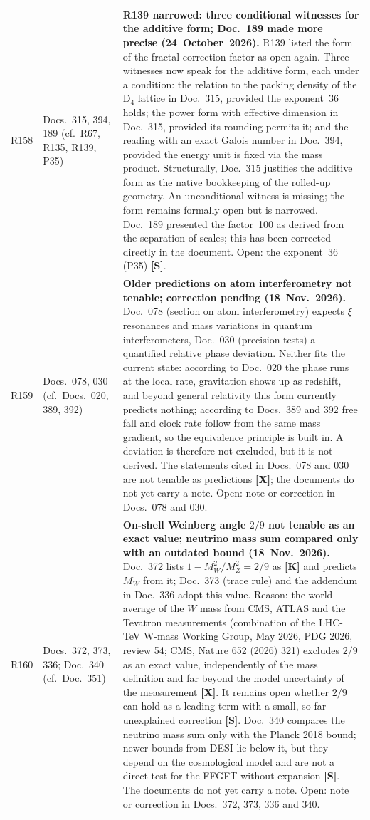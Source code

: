\begin{longtable}{@{}p{0.9cm}p{3.1cm}p{10.2cm}@{}}
R158 & Docs.~315, 394, 189 (cf.\ R67, R135, R139, P35) & \textbf{R139 narrowed: three conditional witnesses for the additive form; Doc.~189 made more precise (24~October~2026).} R139 listed the form of the fractal correction factor as open again. Three witnesses now speak for the additive form, each under a condition: the relation to the packing density of the $\mathrm{D}_4$ lattice in Doc.~315, provided the exponent~36 holds; the power form with effective dimension in Doc.~315, provided its rounding permits it; and the reading with an exact Galois number in Doc.~394, provided the energy unit is fixed via the mass product. Structurally, Doc.~315 justifies the additive form as the native bookkeeping of the rolled-up geometry. An unconditional witness is missing; the form remains formally open but is narrowed. Doc.~189 presented the factor~100 as derived from the separation of scales; this has been corrected directly in the document. Open: the exponent~36 (P35) \textbf{[S]}. \\
R159 & Docs.~078, 030 (cf.\ Docs.~020, 389, 392) & \textbf{Older predictions on atom interferometry not tenable; correction pending (18~Nov.~2026).} Doc.~078 (section on atom interferometry) expects $\xi$ resonances and mass variations in quantum interferometers, Doc.~030 (precision tests) a quantified relative phase deviation. Neither fits the current state: according to Doc.~020 the phase runs at the local rate, gravitation shows up as redshift, and beyond general relativity this form currently predicts nothing; according to Docs.~389 and 392 free fall and clock rate follow from the same mass gradient, so the equivalence principle is built in. A deviation is therefore not excluded, but it is not derived. The statements cited in Docs.~078 and 030 are not tenable as predictions \textbf{[X]}; the documents do not yet carry a note. Open: note or correction in Docs.~078 and 030. \\
R160 & Docs.~372, 373, 336; Doc.~340 (cf.\ Doc.~351) & \textbf{On-shell Weinberg angle $2/9$ not tenable as an exact value; neutrino mass sum compared only with an outdated bound (18~Nov.~2026).} Doc.~372 lists $1-M_W^2/M_Z^2=2/9$ as \textbf{[K]} and predicts $M_W$ from it; Doc.~373 (trace rule) and the addendum in Doc.~336 adopt this value. Reason: the world average of the $W$ mass from CMS, ATLAS and the Tevatron measurements (combination of the LHC-TeV W-mass Working Group, May 2026, PDG 2026, review 54; CMS, Nature 652 (2026) 321) excludes $2/9$ as an exact value, independently of the mass definition and far beyond the model uncertainty of the measurement \textbf{[X]}. It remains open whether $2/9$ can hold as a leading term with a small, so far unexplained correction \textbf{[S]}. Doc.~340 compares the neutrino mass sum only with the Planck 2018 bound; newer bounds from DESI lie below it, but they depend on the cosmological model and are not a direct test for the FFGFT without expansion \textbf{[S]}. The documents do not yet carry a note. Open: note or correction in Docs.~372, 373, 336 and 340. \\

\end{longtable}
